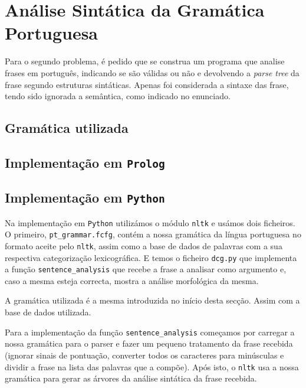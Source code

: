 \documentclass[12pt,a4paper,oneside]{article}
\begin{document}
\section{Análise Sintática da Gramática Portuguesa}
\label{sec:sin}

Para o segundo problema, é pedido que se construa um programa que
analise frases em português, indicando se são válidas ou não e
devolvendo a \textit{parse tree} da frase segundo estruturas
sintáticas. Apenas foi considerada a sintaxe das frase, tendo sido
ignorada a semântica, como indicado no enunciado.
 
\subsection{Gramática utilizada}

\lipsum[1]

\lipsum[2]

\lipsum[3]


\subsection{Implementação em \texttt{Prolog}}

\lipsum[1]

\lipsum[2]

\lipsum[3]

\subsection{Implementação em \texttt{Python}}

Na implementação em \texttt{Python} utilizámos o módulo \texttt{nltk} e
usámos dois ficheiros. O primeiro, \texttt{pt\_grammar.fcfg}, contém a nossa
gramática da língua portuguesa no formato aceite pelo \texttt{nltk}, assim como
a base de dados de palavras com a sua respectiva categorização lexicográfica.
E temos o ficheiro \texttt{dcg.py} que implementa a função \texttt{sentence\_analysis}
que recebe a frase a analisar como argumento e, caso a mesma esteja correcta, mostra
a análise morfológica da mesma.

A gramática utilizada é a mesma introduzida no início desta secção. Assim com a base
de dados utilizada.

Para a implementação da função \texttt{sentence\_analysis} começamos por carregar a
nossa gramática para o parser e fazer um pequeno tratamento da frase recebida (ignorar
sinais de pontuação, converter todos os caracteres para minúsculas e dividir a frase
na lista das palavras que a compõe). Após isto, o \texttt{nltk} usa a nossa gramática
para gerar as árvores da análise sintática da frase recebida.
\end{document}
